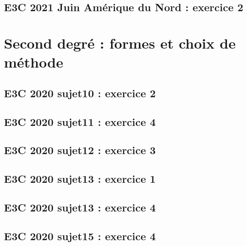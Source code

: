 \documentclass[lang=fr,edition=teacher,layout=sheet]{mxbook}
\begin{document}
\begingroup\endgroup
\par\bigskip
{}\subsection*{E3C 2021 Juin Amérique du Nord : exercice 2}
\begingroup\endgroup
\par\bigskip
\clearpage\section*{Second degré : formes et choix de méthode}
\subsection*{E3C 2020 sujet10 : exercice 2}
\begingroup\endgroup
\par\bigskip
{}\subsection*{E3C 2020 sujet11 : exercice 4}
\begingroup\endgroup
\par\bigskip
{}\subsection*{E3C 2020 sujet12 : exercice 3}
\begingroup\endgroup
\par\bigskip
{}\subsection*{E3C 2020 sujet13 : exercice 1}
\begingroup\endgroup
\par\bigskip
{}\subsection*{E3C 2020 sujet13 : exercice 4}
\begingroup\endgroup
\par\bigskip
{}\subsection*{E3C 2020 sujet15 : exercice 4}
\end{document}
